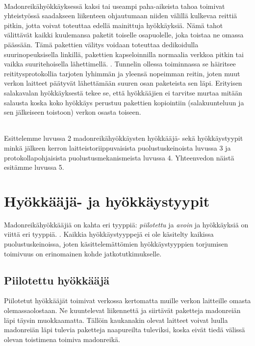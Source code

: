 \documentclass[finnish]{tktltiki2}
\theoremstyle{definition}
\theoremstyle{remark}
\begin{document}
\noindent \\
Madonreikähyökkäyksessä kaksi tai useampi paha-aikeista tahoa toimivat yhteistyössä saadakseen liikenteen ohjautumaan niiden välillä kulkevaa reittiä pitkin, jotta voivat toteuttaa edellä mainittuja hyökkäyksiä. Nämä tahot välittävät kaikki kuulemansa paketit toiselle osapuolelle, joka toistaa ne omassa päässään. Tämä pakettien välitys voidaan toteuttaa dedikoidulla suurinopeuksisella linkillä, pakettien kapseloinnilla normaalia verkkoa pitkin tai vaikka suuritehoisella lähettimellä. \cite{liteworp}. Tunnelin ollessa toiminnassa se häiritsee reititysprotokollia tarjoten lyhimmän ja yleensä nopeimman reitin, joten muut verkon laitteet päätyvät lähettämään suuren osan paketeista sen läpi. Erityisen salakavalan hyökkäyksestä tekee se, että hyökkääjien ei tarvitse murtaa mitään salausta koska koko hyökkäys perustuu pakettien kopiointiin (salakuunteluun ja sen jälkeiseen toistoon) verkon osasta toiseen.

\noindent \\
Esittelemme luvussa 2 madonreikähyökkäysten hyökkääjä- \cite{delphi} sekä hyökkäystyypit \cite{liteworp} minkä jälkeen kerron laitteistoriippuvaisista puolustuskeinoista luvussa 3 ja protokollapohjaisista puolustusmekanismeista luvussa 4. Yhteenvedon näistä esitämme luvussa 5.

\section{Hyökkääjä- ja hyökkäystyypit}

Madonreikähyökkääjiä on kahta eri tyyppiä: \emph{piilotettu} ja \emph{avoin} \cite{delphi} ja hyökkäyksiä on viittä eri tyyppiä. \cite{liteworp}. Kaikkia hyökkäystyyppejä ei ole käsitelty kaikissa puolustuskeinoissa, joten käsittelemättömien hyökkäystyyppien torjumisen toimivuus on erinomainen kohde jatkotutkimukselle.

\subsection{Piilotettu hyökkääjä}

Piilotetut hyökkääjät toimivat verkossa kertomatta muille verkon laitteille omasta olemassaolostaan. Ne kuuntelevat liikennettä ja siirtävät paketteja madonreiän läpi täysin muokkaamatta. Tällöin kaukanakin olevat laitteet voivat luulla madonreiän läpi tulevia paketteja naapureilta tuleviksi, koska eivät tiedä välissä olevan toistimena toimiva madonreikä.
\end{document}

